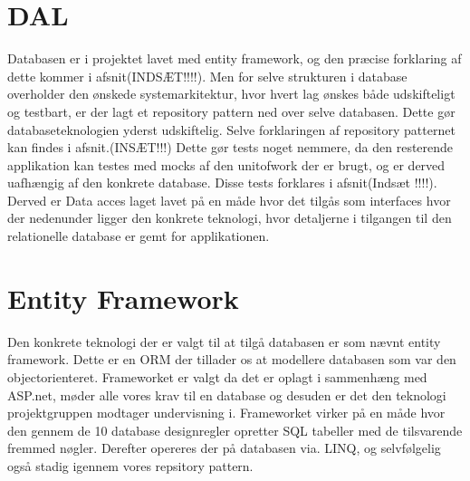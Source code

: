 \section{DAL} 
Databasen er i projektet lavet med entity framework, og den præcise forklaring af dette kommer i afsnit(INDSÆT!!!!). Men for selve strukturen i database overholder den ønskede systemarkitektur, hvor hvert lag ønskes både udskifteligt og testbart, er der lagt et repository pattern ned over selve databasen. Dette gør databaseteknologien yderst udskiftelig. Selve forklaringen af repository patternet kan findes i afsnit.(INSÆT!!!) Dette gør tests noget nemmere, da den resterende applikation kan testes med mocks af den unitofwork der er brugt, og er derved uafhængig af den konkrete database. Disse tests forklares i afsnit(Indsæt !!!!). Derved er Data acces laget lavet på en måde hvor det tilgås som interfaces hvor der nedenunder ligger den konkrete teknologi, hvor detaljerne i tilgangen til den relationelle database er gemt for applikationen.      

\section{Entity Framework}
Den konkrete teknologi der er valgt til at tilgå databasen er som nævnt entity framework. Dette er en ORM der tillader os at modellere databasen som var den objectorienteret. Frameworket er valgt da det er oplagt i sammenhæng med ASP.net, møder alle vores krav til en database og desuden er det den teknologi projektgruppen modtager undervisning i. Frameworket virker på en måde hvor den gennem de 10 database designregler opretter SQL tabeller med de tilsvarende fremmed nøgler. Derefter  opereres der på databasen via. LINQ, og selvfølgelig også stadig igennem vores repsitory pattern.      